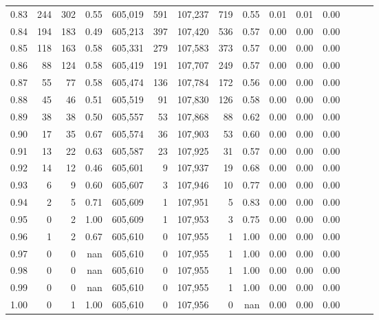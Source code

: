 \begin{tabular}{rrrrrrrrrrrrrrr}
0.83 &     244 &    302 &  0.55 &  605,019 &      591 &  107,237 &      719 &  0.55 &  0.01 &  0.01 &      0.00 \\
0.84 &     194 &    183 &  0.49 &  605,213 &      397 &  107,420 &      536 &  0.57 &  0.00 &  0.00 &      0.00 \\
0.85 &     118 &    163 &  0.58 &  605,331 &      279 &  107,583 &      373 &  0.57 &  0.00 &  0.00 &      0.00 \\
0.86 &      88 &    124 &  0.58 &  605,419 &      191 &  107,707 &      249 &  0.57 &  0.00 &  0.00 &      0.00 \\
0.87 &      55 &     77 &  0.58 &  605,474 &      136 &  107,784 &      172 &  0.56 &  0.00 &  0.00 &      0.00 \\
0.88 &      45 &     46 &  0.51 &  605,519 &       91 &  107,830 &      126 &  0.58 &  0.00 &  0.00 &      0.00 \\
0.89 &      38 &     38 &  0.50 &  605,557 &       53 &  107,868 &       88 &  0.62 &  0.00 &  0.00 &      0.00 \\
0.90 &      17 &     35 &  0.67 &  605,574 &       36 &  107,903 &       53 &  0.60 &  0.00 &  0.00 &      0.00 \\
0.91 &      13 &     22 &  0.63 &  605,587 &       23 &  107,925 &       31 &  0.57 &  0.00 &  0.00 &      0.00 \\
0.92 &      14 &     12 &  0.46 &  605,601 &        9 &  107,937 &       19 &  0.68 &  0.00 &  0.00 &      0.00 \\
0.93 &       6 &      9 &  0.60 &  605,607 &        3 &  107,946 &       10 &  0.77 &  0.00 &  0.00 &      0.00 \\
0.94 &       2 &      5 &  0.71 &  605,609 &        1 &  107,951 &        5 &  0.83 &  0.00 &  0.00 &      0.00 \\
0.95 &       0 &      2 &  1.00 &  605,609 &        1 &  107,953 &        3 &  0.75 &  0.00 &  0.00 &      0.00 \\
0.96 &       1 &      2 &  0.67 &  605,610 &        0 &  107,955 &        1 &  1.00 &  0.00 &  0.00 &      0.00 \\
0.97 &       0 &      0 &   nan &  605,610 &        0 &  107,955 &        1 &  1.00 &  0.00 &  0.00 &      0.00 \\
0.98 &       0 &      0 &   nan &  605,610 &        0 &  107,955 &        1 &  1.00 &  0.00 &  0.00 &      0.00 \\
0.99 &       0 &      0 &   nan &  605,610 &        0 &  107,955 &        1 &  1.00 &  0.00 &  0.00 &      0.00 \\
1.00 &       0 &      1 &  1.00 &  605,610 &        0 &  107,956 &        0 &   nan &  0.00 &  0.00 &      0.00 \\
\bottomrule
\end{tabular}
